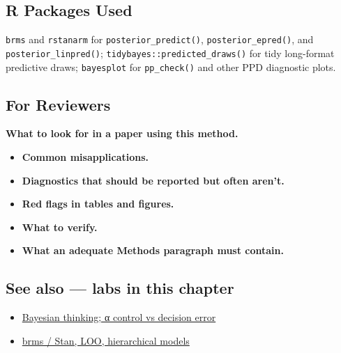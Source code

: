 \documentclass[
]{article}
\providecommand{\tightlist}{%
  \setlength{\itemsep}{0pt}\setlength{\parskip}{0pt}}
\begin{document}
\subsection{R Packages Used}\label{r-packages-used}

\texttt{brms} and \texttt{rstanarm} for \texttt{posterior\_predict()},
\texttt{posterior\_epred()}, and \texttt{posterior\_linpred()};
\texttt{tidybayes::predicted\_draws()} for tidy long-format predictive
draws; \texttt{bayesplot} for \texttt{pp\_check()} and other PPD
diagnostic plots.

\subsection{For Reviewers}\label{for-reviewers}

\textbf{What to look for in a paper using this method.}

\begin{itemize}
\tightlist
\item
  \textbf{Common misapplications.}
\item
  \textbf{Diagnostics that should be reported but often aren't.}
\item
  \textbf{Red flags in tables and figures.}
\item
  \textbf{What to verify.}
\item
  \textbf{What an adequate Methods paragraph must contain.}
\end{itemize}

\subsection{See also --- labs in this
chapter}\label{see-also-labs-in-this-chapter}

\begin{itemize}
\tightlist
\item
  \href{labs/lab-bayesian-thinking-control-vs-decision-error.Rmd}{Bayesian
  thinking; α control vs decision error}
\item
  \href{labs/lab-brms-stan-loo-hierarchical-models.Rmd}{brms / Stan,
  LOO, hierarchical models}
\end{itemize}
\end{document}
